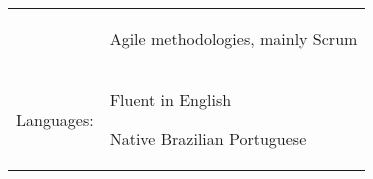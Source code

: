 \documentclass[a4paper,12pt]{article}
\begin{document}
\begin{tabular}{rp{15.2cm}}
& \begin{itemize*}[label=\Large\textbullet]
    \item Agile methodologies, mainly Scrum
\end{itemize*}\\
\raggedleft Languages:
& \begin{itemize*}[label=\Large\textbullet]
    \item Fluent in English
    \item Native Brazilian Portuguese
\end{itemize*}\\
\end{tabular}
\end{document}
